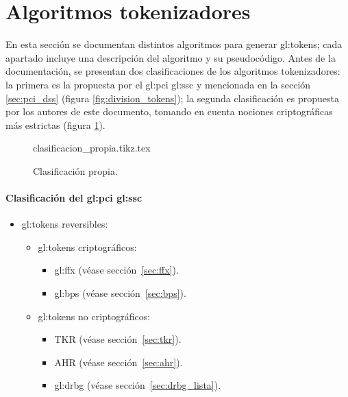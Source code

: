 %
%

\section{Algoritmos tokenizadores}
\label{sec:algoritmos}

En esta sección se documentan distintos algoritmos para generar
\glspl{gl:token}; cada apartado incluye una descripción del
algoritmo y su pseudocódigo. Antes de la documentación, se presentan
dos clasificaciones de los algoritmos tokenizadores: la primera es la propuesta
por el \gls{gl:pci} \gls{gl:ssc} y mencionada en la sección \ref{sec:pci_dss}
(figura \ref{fig:division_tokens}); la segunda clasificación es propuesta por
los autores de este documento, tomando en cuenta nociones criptográficas más
estrictas (figura \ref{fig:division_propia}).

\begin{figure}[h]
  \begin{center}
    {clasificacion_propia.tikz.tex}
    \caption{Clasificación propia.}
    \label{fig:division_propia}
  \end{center}
\end{figure}

\paragraph{Clasificación del
  \texorpdfstring{\acrlong{gl:pci}}{PCI} \texorpdfstring{\acrlong{gl:ssc}}{SSC}}

\begin{itemize}
  \item \Glspl{gl:token} reversibles:
    \begin{itemize}
      \item \Glspl{gl:token} criptográficos:
        \begin{itemize}
          \item \Gls{gl:ffx} (véase sección~\ref{sec:ffx}).
          \item \Gls{gl:bps} (véase sección~\ref{sec:bps}).
        \end{itemize}
      \item \Glspl{gl:token} no criptográficos:
        \begin{itemize}
          \item TKR (véase sección~\ref{sec:tkr}).
          \item AHR (véase sección~\ref{sec:ahr}).
          \item \Gls{gl:drbg} (véase sección~\ref{sec:drbg_lista}).
        \end{itemize}
    \end{itemize}
\end{itemize}

